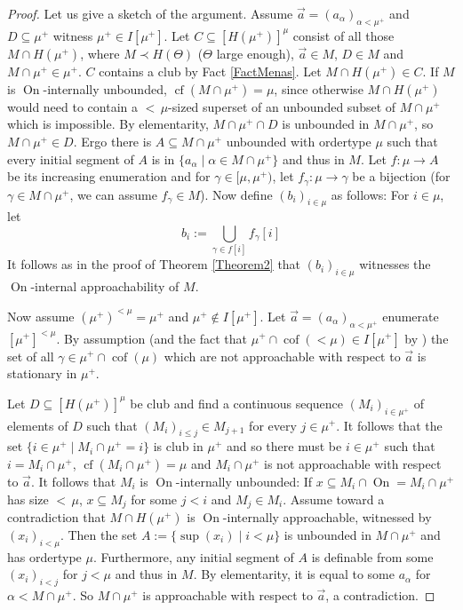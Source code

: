 \documentclass[a4paper]{amsart}
\theoremstyle{definition}
\theoremstyle{remark}
\theoremstyle{plain}
\numberwithin{mydef}{section}
\DeclareMathOperator{\cof}{cof}
\DeclareMathOperator{\cf}{cf}
\DeclareMathOperator{\On}{On}
\begin{document}
	\begin{proof}
		Let us give a sketch of the argument. Assume $\vec{a}=(a_{\alpha})_{\alpha<\mu^+}$ and $D\subseteq\mu^+$ witness $\mu^+\in I[\mu^+]$. Let $C\subseteq[H(\mu^+)]^{\mu}$ consist of all those $M\cap H(\mu^+)$, where $M\prec H(\Theta)$ ($\Theta$ large enough), $\vec{a}\in M$, $D\in M$ and $M\cap\mu^+\in\mu^+$. $C$ contains a club by Fact \ref{FactMenas}. Let $M\cap H(\mu^+)\in C$. If $M$ is $\On$-internally unbounded, $\cf(M\cap\mu^+)=\mu$, since otherwise $M\cap H(\mu^+)$ would need to contain a ${<}\,\mu$-sized superset of an unbounded subset of $M\cap\mu^+$ which is impossible. By elementarity, $M\cap\mu^+\cap D$ is unbounded in $M\cap\mu^+$, so $M\cap\mu^+\in D$. Ergo there is $A\subseteq M\cap\mu^+$ unbounded with ordertype $\mu$ such that every initial segment of $A$ is in $\{a_{\alpha}\;|\;\alpha\in M\cap\mu^+\}$ and thus in $M$. Let $f\colon\mu\to A$ be its increasing enumeration and for $\gamma\in[\mu,\mu^+)$, let $f_{\gamma}\colon\mu\to\gamma$ be a bijection (for $\gamma\in M\cap\mu^+$, we can assume $f_{\gamma}\in M$). Now define $(b_i)_{i\in\mu}$ as follows: For $i\in\mu$, let
		$$b_i:=\bigcup_{\gamma\in f[i]}f_{\gamma}[i]$$
		It follows as in the proof of Theorem \ref{Theorem2} that $(b_i)_{i\in\mu}$ witnesses the $\On$-internal approachability of $M$.
		
		Now assume $(\mu^+)^{<\mu}=\mu^+$ and $\mu^+\notin I[\mu^+]$. Let $\vec{a}=(a_{\alpha})_{\alpha<\mu^+}$ enumerate $[\mu^+]^{<\mu}$. By assumption (and the fact that $\mu^+\cap\cof(<\mu)\in I[\mu^+]$ by \cite[Lemma 4.4]{ShelahApproachability}) the set of all $\gamma\in\mu^+\cap\cof(\mu)$ which are not approachable with respect to $\vec{a}$ is stationary in $\mu^+$.
		
		Let $D\subseteq[H(\mu^+)]^{\mu}$ be club and find a continuous sequence $(M_i)_{i\in\mu^+}$ of elements of $D$ such that $(M_i)_{i\leq j}\in M_{j+1}$ for every $j\in\mu^+$. It follows that the set $\{i\in\mu^+\;|\;M_i\cap\mu^+=i\}$ is club in $\mu^+$ and so there must be $i\in\mu^+$ such that $i=M_i\cap\mu^+$, $\cf(M_i\cap\mu^+)=\mu$ and $M_i\cap\mu^+$ is not approachable with respect to $\vec{a}$. It follows that $M_i$ is $\On$-internally unbounded: If $x\subseteq M_i\cap\On=M_i\cap\mu^+$ has size ${<}\,\mu$, $x\subseteq M_j$ for some $j<i$ and $M_j\in M_i$. Assume toward a contradiction that $M\cap H(\mu^+)$ is $\On$-internally approachable, witnessed by $(x_i)_{i<\mu}$. Then the set $A:=\{\sup(x_i)\;|\;i<\mu\}$ is unbounded in $M\cap\mu^+$ and has ordertype $\mu$. Furthermore, any initial segment of $A$ is definable from some $(x_i)_{i<j}$ for $j<\mu$ and thus in $M$. By elementarity, it is equal to some $a_{\alpha}$ for $\alpha<M\cap\mu^+$. So $M\cap\mu^+$ is approachable with respect to $\vec{a}$, a contradiction.
	\end{proof}
	
\end{document}
